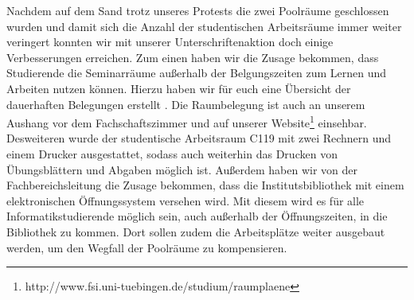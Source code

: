 Nachdem auf dem Sand trotz unseres Protests die zwei Poolräume  geschlossen wurden und damit sich die Anzahl der studentischen Arbeitsräume immer weiter veringert konnten wir mit unserer Unterschriftenaktion doch einige Verbesserungen erreichen. Zum einen haben wir die Zusage bekommen, dass Studierende die Seminarräume außerhalb der Belgungszeiten zum Lernen und Arbeiten nutzen können. Hierzu haben wir für euch eine Übersicht der dauerhaften Belegungen erstellt . Die Raumbelegung ist auch an unserem Aushang vor dem Fachschaftszimmer und auf unserer Website\footnote{http://www.fsi.uni-tuebingen.de/studium/raumplaene} einsehbar.\\
Desweiteren wurde der studentische Arbeitsraum C119 mit zwei Rechnern und einem Drucker ausgestattet, sodass auch weiterhin das Drucken von Übungsblättern und Abgaben möglich ist.
Außerdem haben wir von der Fachbereichsleitung die Zusage bekommen, dass die Institutsbibliothek mit einem elektronischen Öffnungssystem versehen wird. Mit diesem wird es für alle Informatikstudierende möglich sein, auch außerhalb der Öffnungszeiten, in die Bibliothek zu kommen. Dort sollen zudem die Arbeitsplätze weiter ausgebaut werden, um den Wegfall der Poolräume zu kompensieren.